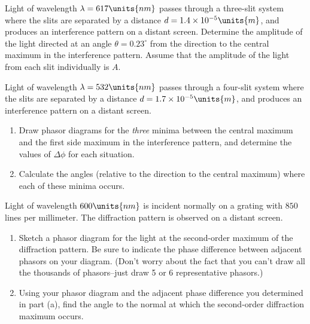 \begin{problem}
Light of wavelength $\lambda = 617\units{nm}$ passes
through a three-slit system where the slits are separated by a
distance $d = 1.4 \times 10^{-5}\units{m}$, and produces an
interference pattern on a distant screen. Determine the amplitude of the 
light directed at an angle $\theta = 0.23^\circ$ from the direction to 
the central maximum in the interference pattern. Assume that the amplitude 
of the light from each slit individually is $A$.
\end{problem}

\begin{problem}
Light of wavelength $\lambda = 532\units{nm}$ passes
through a four-slit system where the slits are separated by a
distance $d = 1.7 \times 10^{-5}\units{m}$, and produces an
interference pattern on a distant screen.
\begin{enumerate}
\item  Draw phasor diagrams for the {\em three} minima between the central
maximum and the first side maximum in the interference pattern, and
determine the values of $\Delta\phi$ for each situation.
\item Calculate the angles (relative to the direction to the central
maximum) where each of these minima occurs.
\end{enumerate}
\label{prob:four_slits}
\end{problem}

\begin{problem}
  Light of  wavelength $600\units{nm}$ is  incident normally on a grating  with $850$
  lines per millimeter. The diffraction pattern is observed on a distant screen.
\begin{enumerate}

\item  Sketch a  phasor  diagram  for the  light  at the  second-order
  maximum of the  diffraction pattern.  Be sure to  indicate the phase
  difference between  adjacent phasors on your  diagram.  (Don't worry
  about  the   fact  that  you   can't  draw  all  the   thousands  of
  phasors--just draw 5 or 6 representative phasors.)

\item Using your phasor diagram and the adjacent phase difference you determined
in part (a), find the angle to the normal at which the second-order diffraction
maximum occurs.
\end{enumerate}
\end{problem}


